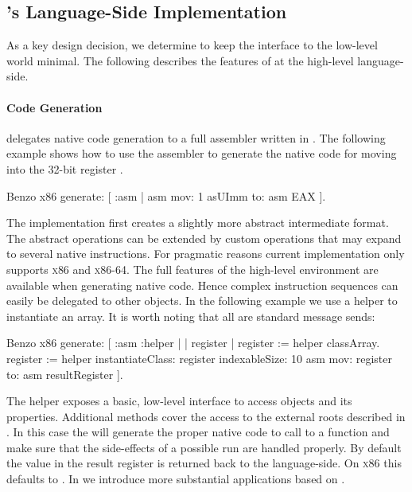 \subsection{\B's Language-Side Implementation}
As a key design decision, we determine to keep the interface to the low-level world minimal.
The following describes the features of \B at the high-level language-side.

\paragraph{Code Generation}

\B delegates native code generation to a full assembler written in \PH. The following example shows how to use the assembler to generate the native code for moving  into the 32-bit register .
%
\begin{stcode}{4}
Benzo x86 generate: [ :asm |
	asm mov: 1 asUImm to: asm EAX ].
\end{stcode}
%
The implementation first creates a slightly more abstract intermediate format.
The abstract operations can be extended by custom operations that may expand to several native instructions. For pragmatic reasons current implementation only supports \textsc{x86} and \textsc{x86-64}.
The full features of the high-level environment are available when generating native code.
Hence complex instruction sequences can easily be delegated to other objects.
In the following example we use a \VM helper to instantiate an array. It is worth noting that all are standard message sends:
%
\begin{stcode}{5}
Benzo x86 generate: [ :asm :helper | | register |
	register := helper classArray.
	register := helper 
		instantiateClass: register
		indexableSize: 10
	asm mov: register to: asm resultRegister ].
\end{stcode}
%
The \VM helper exposes a basic, low-level interface to access objects and its properties.
Additional methods cover the access to the external roots described in .
In this case the  will generate the proper native code to call to a \VM function and make sure that the side-effects of a possible \GC run are handled properly.
By default the value in the result register is returned back to the language-side. On \textsc{x86} this defaults to .
In  we introduce more substantial applications based on \B.

